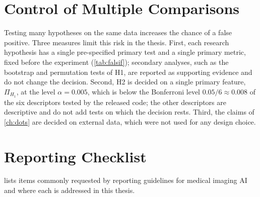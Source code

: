 \section{Control of Multiple Comparisons}

Testing many hypotheses on the same data increases the chance of a false positive. Three
measures limit this risk in the thesis. First, each research hypothesis has a single
pre-specified primary test and a single primary metric, fixed before the experiment
(\cref{tab:falsif}); secondary analyses, such as the bootstrap and permutation tests of H1,
are reported as supporting evidence and do not change the decision. Second, H2 is decided
on a single primary feature, $\Pi_{H_1}$, at the level $\alpha=0.005$, which is below the
Bonferroni level $0.05/6\approx0.008$ of the six descriptors tested by the released code; the
other descriptors are descriptive and do not add tests on which the decision rests. Third,
the claims of \cref{ch:dots} are decided on external data, which were not used for any
design choice.

\section{Reporting Checklist}
\label{sec:checklist}
 lists items commonly requested by reporting guidelines for medical
imaging AI and where each is addressed in this thesis.

